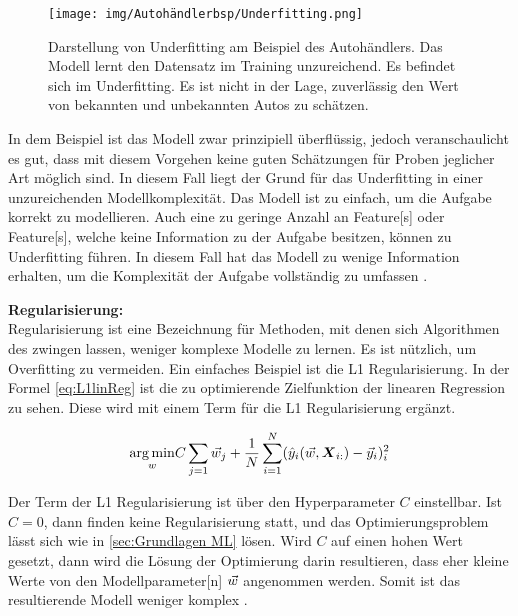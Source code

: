 \begin{figure}[htbp]
    \centering
    \texttt{[image: img/Autohändlerbsp/Underfitting.png]}
    \caption[Darstellung von Underfitting am Beispiel des Autohändlers.]{Darstellung von Underfitting am Beispiel des Autohändlers. Das Modell lernt den Datensatz im Training unzureichend. Es befindet sich im Underfitting. Es ist nicht in der Lage, zuverlässig den Wert von bekannten und unbekannten Autos zu schätzen.}
    \label{fig:BspUnderfitting}
\end{figure}

In dem Beispiel ist das Modell zwar prinzipiell überflüssig, jedoch veranschaulicht es gut, dass mit diesem Vorgehen keine guten Schätzungen für Proben jeglicher Art möglich sind. In diesem Fall liegt der Grund für das \gls{Underfitting} in einer unzureichenden Modellkomplexität. Das Modell ist zu einfach, um die Aufgabe korrekt zu modellieren. Auch eine zu geringe Anzahl an \gls{Feature}[s] oder \gls{Feature}[s], welche keine Information zu der Aufgabe besitzen, können zu \gls{Underfitting} führen. In diesem Fall hat das Modell zu wenige Information erhalten, um die Komplexität der Aufgabe vollständig zu umfassen \cite{Burkov.2019, Bishop.2006, Goodfellow.2016}.  \dubpar

 \clearpage
\textbf{\gls{Regularisierung}:}\\
\gls{Regularisierung} ist eine Bezeichnung für Methoden, mit denen sich Algorithmen des  zwingen lassen, weniger komplexe Modelle zu lernen. Es ist nützlich, um \gls{Overfitting} zu vermeiden. Ein einfaches Beispiel ist die L1 \gls{Regularisierung}. In der Formel \ref{eq:L1linReg} ist die zu optimierende \gls{Zielfunktion} der linearen Regression zu sehen. Diese wird mit einem Term für die L1 \gls{Regularisierung} ergänzt.

\begin{equation}
    \label{eq:L1linReg}
    \underset{w}{\arg\min} C\sum_{j=1}\vec{w}_j + \frac{1}{N} \sum_{i=1}^{N} (\hat{y}_i(\vec{w}, \boldsymbol{X}_{i:}) - \vec{y}_i)_i^2
\end{equation}

Der Term der L1 \gls{Regularisierung} ist über den \gls{Hyperparameter} \(C\) einstellbar. Ist \(C=0\), dann finden keine \gls{Regularisierung} statt, und das Optimierungsproblem lässt sich wie in \autoref{sec:Grundlagen ML} lösen. Wird \(C\) auf einen hohen Wert gesetzt, dann wird die Lösung der Optimierung darin resultieren, dass eher kleine Werte von den  \gls{Modellparameter}[n] \(\vec{w}\) angenommen werden. Somit ist das resultierende Modell weniger komplex \cite{Burkov.2019}. \dubpar

